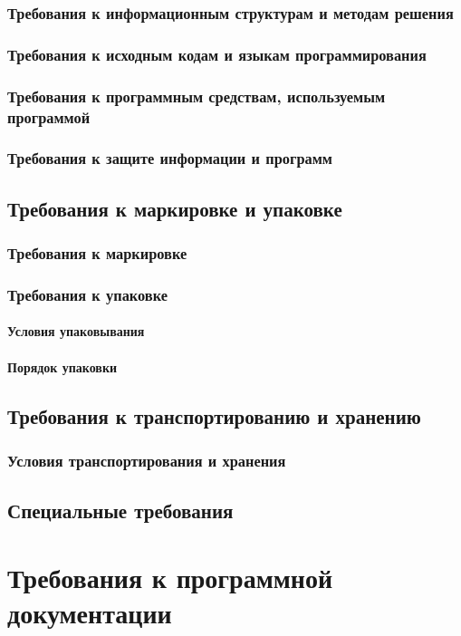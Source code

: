 \documentclass[a4paper,10pt]{article}
\begin{document}
\subsubsection{Требования к информационным структурам и методам решения}
\subsubsection{Требования к исходным кодам и языкам программирования}
\subsubsection{Требования к программным средствам, используемым программой}
\subsubsection{Требования к защите информации и программ}
\subsection{Требования к маркировке и упаковке}
\subsubsection{Требования к маркировке}
\subsubsection{Требования к упаковке}
\paragraph{Условия упаковывания}
\paragraph{Порядок упаковки}
\subsection{Требования к транспортированию и хранению}
\subsubsection{Условия транспортирования и хранения}
\subsection{Специальные требования}
\section{Требования к программной документации}
\end{document}
